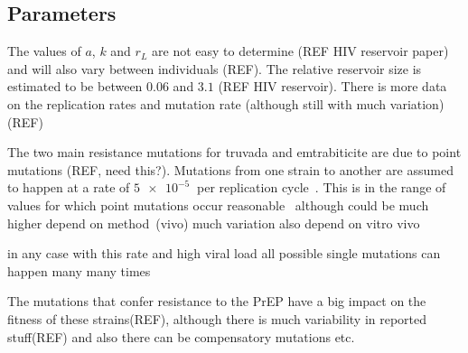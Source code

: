 \documentclass[DIV=15]{scrartcl}
\begin{document}
  



\subsection{Parameters}
\label{Parameters}

The values of $a$, $k$ and $r_L$ are not easy to determine (REF HIV reservoir paper)
and will also vary between individuals (REF). The relative reservoir size is estimated to be between $0.06$ and $3.1$ (REF HIV reservoir). There is more data on the replication rates and mutation rate (although still with much variation) (REF)

The two main resistance mutations for truvada and emtrabiticite are due to point mutations (REF, need this?). Mutations from one strain to another are assumed to happen at a rate of $\SI{5e-5}{}$ per replication cycle~\cite{gao2004}. This is in the range of values for which point mutations occur reasonable~\cite{abram2010}
although could be much higher depend on method~\cite{cuevas2015}(vivo) much variation also depend on vitro vivo

in any case with this rate  and high viral load all possible single mutations can happen many many times~\cite{coffin1995}

The mutations that confer resistance to the PrEP have a big impact on the fitness of these strains(REF), although there is much variability in reported stuff(REF) and also there can be compensatory mutations etc.


\end{document}
